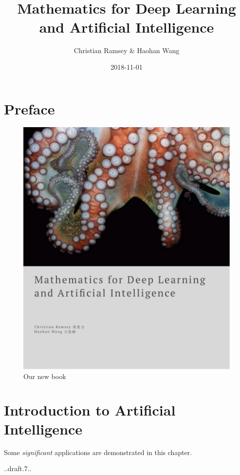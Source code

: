 \documentclass[]{book}
\title{Mathematics for Deep Learning and Artificial Intelligence}
\author{Christian Ramsey \& Haohan Wang}
\date{2018-11-01}
\theoremstyle{definition}
\theoremstyle{definition}
\theoremstyle{definition}
\theoremstyle{remark}
\begin{document}
\maketitle

{
\hypersetup{linkcolor=black}
\setcounter{tocdepth}{1}
\tableofcontents
}
\chapter*{Preface}\label{preface}

\begin{figure}
\centering
\includegraphics{artwork/maths of deep learning.png}
\caption{Our new book}
\end{figure}

\chapter{Introduction to Artificial Intelligence}\label{intro}

Some \emph{significant} applications are demonstrated in this chapter.

..draft.7..
\end{document}
